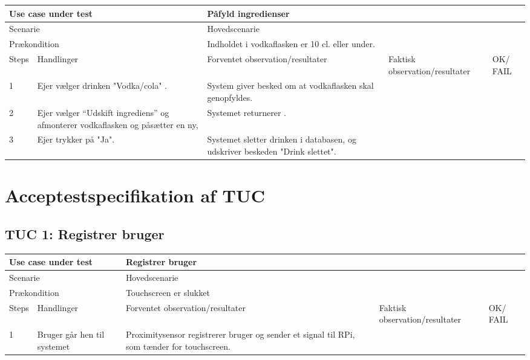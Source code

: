 \begin{table}[H]
\begin{tabular}{|p{1cm}|p{4cm}|p{4cm}|p{4cm}|p{1cm}|}
\hline
\multicolumn{2}{|p{5cm}|}{Use case under test} & \multicolumn{3}{p{9cm}|}{Påfyld ingredienser}                                       \\ \hline
\multicolumn{2}{|p{5cm}|}{Scenarie}            & \multicolumn{3}{p{9cm}|}{Hovedscenarie}                                          \\ \hline
\multicolumn{2}{|p{5cm}|}{Prækondition}        & \multicolumn{3}{p{9cm}|}{Indholdet i vodkaflasken er 10 cl. eller under.}                                 \\ \hline
Steps               & Handlinger          & Forventet observation/resultater & Faktisk observation/resultater & OK/ FAIL \\ \hline
1    & Ejer vælger drinken "Vodka/cola" .  & System giver besked om at vodkaflasken skal genopfyldes.&   &         \\ \hline
2    & Ejer vælger “Udskift ingrediens” og afmonterer vodkaflasken og påsætter en ny,  & Systemet returnerer .  &   &         \\ \hline
3    & Ejer trykker på "Ja".  & Systemet sletter drinken i databasen, og udskriver beskeden "Drink slettet".  &   &         \\ \hline

\end{tabular}
\end{table}


\section{Acceptestspecifikation af TUC}

\subsection{TUC 1: Registrer bruger}

\begin{table}[H]
\begin{tabular}{|p{1cm}|p{4cm}|p{4cm}|p{4cm}|p{1cm}|}
\hline
\multicolumn{2}{|p{5cm}|}{Use case under test} & \multicolumn{3}{p{9cm}|}{Registrer bruger}                                       \\ \hline
\multicolumn{2}{|p{5cm}|}{Scenarie}            & \multicolumn{3}{p{9cm}|}{Hovedscenarie}                                          \\ \hline
\multicolumn{2}{|p{5cm}|}{Prækondition}        & \multicolumn{3}{p{9cm}|}{Touchscreen er slukket}                                 \\ \hline
Steps               & Handlinger          & Forventet observation/resultater & Faktisk observation/resultater & OK/ FAIL \\ \hline
1    & Bruger går hen til systemet  & Proximitysensor registrerer bruger og sender et signal til RPi, som tænder for touchscreen.  &   &         \\ \hline

\end{tabular}
\end{table}

